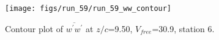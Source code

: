 \begin{figure}[H]
\centering
\texttt{[image: figs/run\_59/run\_59\_ww\_contour]}
\caption{Contour plot of $\overline{w^\prime w^\prime}$ at $z/c$=9.50, $V_{free}$=30.9, station 6.}
\end{figure}


